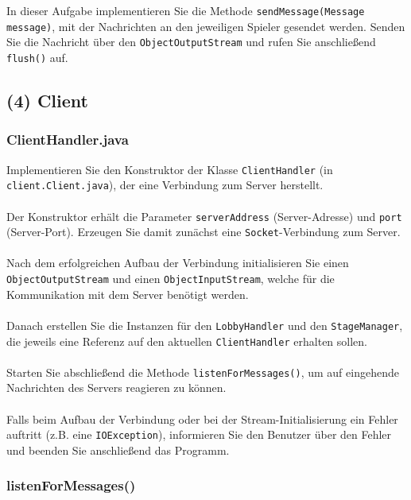 \documentclass[12pt]{article}
\begin{document}
In dieser Aufgabe implementieren Sie die Methode \texttt{sendMessage(Message message)}, 
mit der Nachrichten an den jeweiligen Spieler gesendet werden. 
Senden Sie die Nachricht über den \texttt{ObjectOutputStream} und rufen Sie anschließend \texttt{flush()} auf.

\subsection*{(4) Client}

\subsubsection*{ClientHandler.java}

Implementieren Sie den Konstruktor der Klasse \texttt{ClientHandler} (in \texttt{client.Client.java}), 
der eine Verbindung zum Server herstellt.
\\ \\
Der Konstruktor erhält die Parameter \texttt{serverAddress} (Server-Adresse) und \texttt{port} (Server-Port). 
Erzeugen Sie damit zunächst eine \texttt{Socket}-Verbindung zum Server.
\\ \\
Nach dem erfolgreichen Aufbau der Verbindung initialisieren Sie einen \texttt{ObjectOutputStream} und 
einen \texttt{ObjectInputStream}, welche für die Kommunikation mit dem Server benötigt werden.
\\ \\
Danach erstellen Sie die Instanzen für den \texttt{LobbyHandler} und den \texttt{StageManager}, 
die jeweils eine Referenz auf den aktuellen \texttt{ClientHandler} erhalten sollen.
\\ \\
Starten Sie abschließend die Methode \texttt{listenForMessages()}, um auf eingehende Nachrichten des Servers reagieren zu können.
\\ \\
Falls beim Aufbau der Verbindung oder bei der Stream-Initialisierung ein Fehler auftritt (z.B. eine \texttt{IOException}), 
informieren Sie den Benutzer über den Fehler und beenden Sie anschließend das Programm.

\subsubsection*{listenForMessages()}
\end{document}

